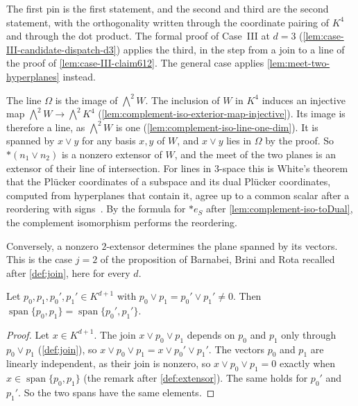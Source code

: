 \begin{fmlnote}
  The first pin is the first statement, and the second and third are
  the second statement, with the orthogonality written through the
  coordinate pairing of $K^4$ and through the dot product. The formal
  proof of Case~III at $d = 3$
  (\cref{lem:case-III-candidate-dispatch-d3}) applies the third, in the
  step from a join to a line of the proof of \cref{lem:case-III-claim612}.
  The general case applies \cref{lem:meet-two-hyperplanes} instead.
\end{fmlnote}

The line $\Omega$ is the image of $\bigwedge^2 W$. The inclusion of $W$
in $K^4$ induces an injective map $\bigwedge^2 W \to \bigwedge^2 K^4$
(\cref{lem:complement-iso-exterior-map-injective}). Its image is
therefore a line, as $\bigwedge^2 W$ is one
(\cref{lem:complement-iso-line-one-dim}). It is spanned
by $x \vee y$ for any basis $x, y$ of $W$, and $x \vee y$ lies in
$\Omega$ by the proof. So $*(n_1 \vee n_2)$ is a nonzero extensor of
$W$, and the meet of the two planes is an extensor of their line of
intersection. For
lines in $3$-space this is White's theorem that the Plücker coordinates
of a subspace and its dual Plücker coordinates, computed from hyperplanes
that contain it, agree up to a common scalar after a reordering with
signs~\cite[\S2]{white1994}. By the formula for $*e_S$ after
\cref{lem:complement-iso-toDual}, the complement isomorphism performs the
reordering.

Conversely, a nonzero $2$-extensor determines the plane spanned by its
vectors. This is the case $j = 2$ of the proposition of Barnabei, Brini
and Rota recalled after \cref{def:join}, here for every $d$.

\begin{lemma}
  \label{lem:decomposable-extensor-span-unique}
  \leanok
  Let $p_0, p_1, p_0', p_1' \in K^{d+1}$ with
  $p_0 \vee p_1 = p_0' \vee p_1' \neq 0$. Then
  $\operatorname{span}\{p_0, p_1\} = \operatorname{span}\{p_0', p_1'\}$.
\end{lemma}
\begin{proof}
  \leanok
  Let $x \in K^{d+1}$. The join $x \vee p_0 \vee p_1$ depends on $p_0$
  and $p_1$ only through $p_0 \vee p_1$ (\cref{def:join}), so
  $x \vee p_0 \vee p_1 = x \vee p_0' \vee p_1'$. The vectors $p_0$ and
  $p_1$ are linearly independent, as their join is nonzero, so
  $x \vee p_0 \vee p_1 = 0$ exactly when
  $x \in \operatorname{span}\{p_0, p_1\}$ (the remark after
  \cref{def:extensor}). The same holds for $p_0'$ and $p_1'$. So the two
  spans have the same elements.
\end{proof}
